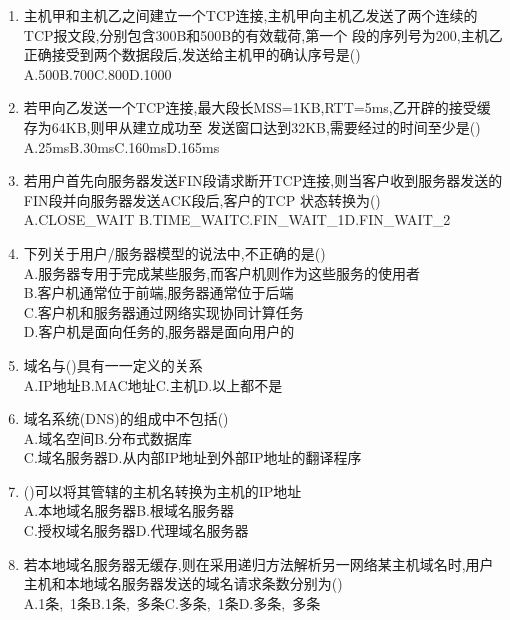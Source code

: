 \documentclass[12pt, a4paper, oneside, UTF8]{ctexbook}
\begin{document}
\begin{enumerate}
    \item 主机甲和主机乙之间建立一个TCP连接,主机甲向主机乙发送了两个连续的TCP报文段,分别包含300B和500B的有效载荷,第一个
    段的序列号为200,主机乙正确接受到两个数据段后,发送给主机甲的确认序号是() \\
    A.500\qquad B.700\qquad C.800\qquad D.1000

    \item 若甲向乙发送一个TCP连接,最大段长MSS=1KB,RTT=5ms,乙开辟的接受缓存为64KB,则甲从建立成功至
    发送窗口达到32KB,需要经过的时间至少是() \\
    A.25ms\qquad B.30ms\qquad C.160ms\qquad D.165ms

    \item 若用户首先向服务器发送FIN段请求断开TCP连接,则当客户收到服务器发送的FIN段并向服务器发送ACK段后,客户的TCP
    状态转换为() \\
    A.CLOSE\_WAIT \qquad B.TIME\_WAIT\qquad C.FIN\_WAIT\_1\qquad D.FIN\_WAIT\_2

    \item 下列关于用户/服务器模型的说法中,不正确的是() \\
    A.服务器专用于完成某些服务,而客户机则作为这些服务的使用者 \\
    B.客户机通常位于前端,服务器通常位于后端 \\
    C.客户机和服务器通过网络实现协同计算任务 \\
    D.客户机是面向任务的,服务器是面向用户的

    \item 域名与()具有一一定义的关系 \\
    A.IP地址\qquad B.MAC地址\qquad C.主机\qquad D.以上都不是

    \item 域名系统(DNS)的组成中不包括() \\
    A.域名空间\qquad B.分布式数据库 \\
    C.域名服务器\qquad D.从内部IP地址到外部IP地址的翻译程序

    \item ()可以将其管辖的主机名转换为主机的IP地址 \\
    A.本地域名服务器\qquad B.根域名服务器 \\
    C.授权域名服务器\qquad D.代理域名服务器 

    \item 若本地域名服务器无缓存,则在采用递归方法解析另一网络某主机域名时,用户主机和本地域名服务器发送的域名请求条数分别为() \\
    A.1条,\ 1条\qquad B.1条,\ 多条\qquad C.多条,\ 1条\qquad D.多条,\ 多条


\end{enumerate}
\end{document}
